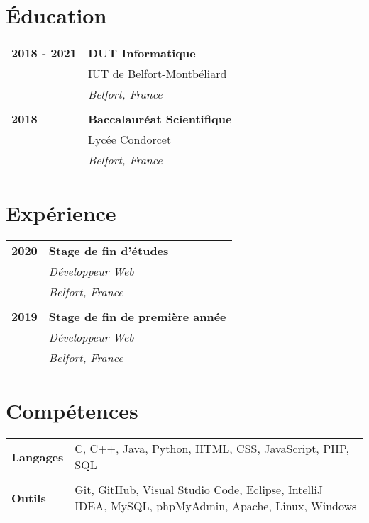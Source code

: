 \documentclass[a4paper, 12pt]{article}
\begin{document}
\begin{minipage}[t]{0.65\textwidth}

    \section*{\textcolor{sectioncolor}{Éducation}}
    \begin{tabular}{ m{} m{} }
        \textbf{2018 - 2021} & \textbf{DUT Informatique} \\
        & IUT de Belfort-Montbéliard \\
        & \textit{Belfort, France} \\
        & \\
        \textbf{2018} & \textbf{Baccalauréat Scientifique} \\
        & Lycée Condorcet \\
        & \textit{Belfort, France} \\
    \end{tabular}

    \section*{\textcolor{sectioncolor}{Expérience}}
    \begin{tabular}{ m{} m{} }
        \textbf{2020} & \textbf{Stage de fin d'études} \\
        & \textit{Développeur Web} \\
        & \textit{Belfort, France} \\
        & \\
        \textbf{2019} & \textbf{Stage de fin de première année} \\
        & \textit{Développeur Web} \\
        & \textit{Belfort, France} \\
    \end{tabular}

    \section*{\textcolor{sectioncolor}{Compétences}}
    \begin{tabular}{ m{} m{} }
        \textbf{Langages} & C, C++, Java, Python, HTML, CSS, JavaScript, PHP, SQL \\
        & \\
        \textbf{Outils} & Git, GitHub, Visual Studio Code, Eclipse, IntelliJ IDEA, MySQL, phpMyAdmin, Apache, Linux, Windows
    \end{tabular}

\end{minipage}
\end{document}
